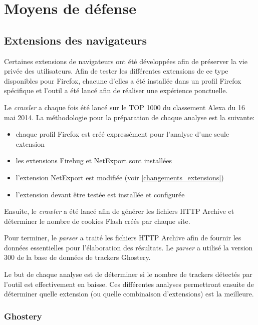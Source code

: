 \chapter{Moyens de défense}
\section{Extensions des navigateurs}
Certaines extensions de navigateurs ont été développées afin de préserver la vie privée des utilisateurs.
Afin de tester les différentes extensions de ce type disponibles pour Firefox, chacune d'elles a été installée dans un profil Firefox spécifique et l'outil a été lancé afin de réaliser une expérience ponctuelle.
\newline

Le \textit{crawler} a chaque fois été lancé sur le TOP 1000 du classement Alexa \cite{AlexaTop} du 16 mai 2014. La méthodologie pour la préparation de chaque analyse est la suivante:
\begin{itemize}
  \item chaque profil Firefox est créé expressément pour l'analyse d'une seule extension
  \item les extensions Firebug et NetExport sont installées
  \item l'extension NetExport est modifiée (voir \autoref{changements_extensions})
  \item l'extension devant être testée est installée et configurée
  \newline
\end{itemize}

Ensuite, le \textit{crawler} a été lancé afin de générer les fichiers HTTP Archive et déterminer le nombre de cookies Flash créés par chaque site.
\newline

Pour terminer, le \textit{parser} a traité les fichiers HTTP Archive afin de fournir les données essentielles pour l'élaboration des résultats. Le \textit{parser} a utilisé la version 300 de la base de données de trackers Ghostery.
\newline

Le but de chaque analyse est de déterminer si le nombre de trackers détectés par l'outil est effectivement en baisse. Ces différentes analyses permettront ensuite de déterminer quelle extension (ou quelle combinaison d'extensions) est la meilleure.

\subsection{Ghostery}
